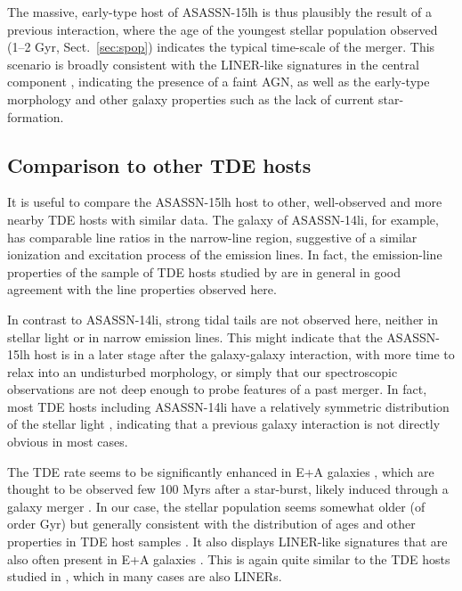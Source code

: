 \documentclass[traditabstract]{aa}
\begin{document}
The massive, early-type host of ASASSN-15lh is thus plausibly the result of a previous interaction, where the age of the youngest stellar population observed (1--2 Gyr, Sect.~\ref{sec:spop}) indicates the typical time-scale of the merger. This scenario is broadly consistent with the LINER-like signatures in the central component \citep[e.g.,][]{2004ApJ...605..105C}, indicating the presence of a faint AGN, as well as the early-type morphology and other galaxy properties such as the lack of current star-formation.

\subsection{Comparison to other TDE hosts}

It is useful to compare the ASASSN-15lh host to other, well-observed and more nearby TDE hosts with similar data. The galaxy of ASASSN-14li, for example, has comparable line ratios in the narrow-line region, suggestive of a similar ionization and excitation process of the emission lines. In fact, the emission-line properties of the sample of TDE hosts studied by \citet{2017ApJ...835..176F} are in general in good agreement with the line properties observed here.

In contrast to ASASSN-14li, strong tidal tails are not observed here, neither in stellar light or in narrow emission lines. This might indicate that the ASASSN-15lh host is in a later stage after the galaxy-galaxy interaction, with more time to relax into an undisturbed morphology, or simply that our spectroscopic observations are not deep enough to probe features of a past merger. In fact, most TDE hosts including ASASSN-14li have a relatively symmetric distribution of the stellar light  \citep{2017arXiv170701559L}, indicating that a previous galaxy interaction is not directly obvious in most cases.

The TDE rate seems to be significantly enhanced in E+A galaxies \citep{2014ApJ...793...38A, 2016ApJ...818L..21F}, which are thought to be observed few 100 Myrs after a star-burst, likely induced through a galaxy merger \citep{2005MNRAS.357..937G}. In our case, the stellar population seems somewhat older (of order Gyr) but generally consistent with the distribution of ages and other properties in TDE host samples \citep{2017ApJ...835..176F, 2017arXiv170701559L}. It also displays LINER-like signatures that are also often present in E+A galaxies \citep{2006ApJ...646L..33Y}. This is again quite similar to the TDE hosts studied in \citet{2017ApJ...835..176F}, which in many cases are also LINERs.
\end{document}
